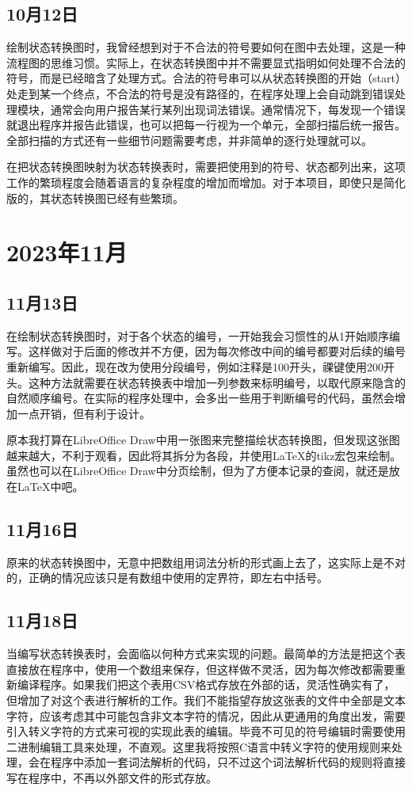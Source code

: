 \subsection{10月12日}
绘制状态转换图时，我曾经想到对于不合法的符号要如何在图中去处理，这是一种流程图的思维习惯。实际上，在状态转换图中并不需要显式指明如何处理不合法的符号，而是已经暗含了处理方式。合法的符号串可以从状态转换图的开始（start）处走到某一个终点，不合法的符号是没有路径的，在程序处理上会自动跳到错误处理模块，通常会向用户报告某行某列出现词法错误。通常情况下，每发现一个错误就退出程序并报告此错误，也可以把每一行视为一个单元，全部扫描后统一报告。全部扫描的方式还有一些细节问题需要考虑，并非简单的逐行处理就可以。

在把状态转换图映射为状态转换表时，需要把使用到的符号、状态都列出来，这项工作的繁琐程度会随着语言的复杂程度的增加而增加。对于本项目，即使只是简化版的，其状态转换图已经有些繁琐。


\section{2023年11月}


\subsection{11月13日}
在绘制状态转换图时，对于各个状态的编号，一开始我会习惯性的从1开始顺序编写。这样做对于后面的修改并不方便，因为每次修改中间的编号都要对后续的编号重新编写。因此，现在改为使用分段编号，例如注释是100开头，祼键使用200开头。这种方法就需要在状态转换表中增加一列参数来标明编号，以取代原来隐含的自然顺序编号。在实际的程序处理中，会多出一些用于判断编号的代码，虽然会增加一点开销，但有利于设计。

原本我打算在LibreOffice Draw中用一张图来完整描绘状态转换图，但发现这张图越来越大，不利于观看，因此将其拆分为各段，并使用LaTeX的tikz宏包来绘制。虽然也可以在LibreOffice Draw中分页绘制，但为了方便本记录的查阅，就还是放在LaTeX中吧。


\subsection{11月16日}
原来的状态转换图中，无意中把数组用词法分析的形式画上去了，这实际上是不对的，正确的情况应该只是有数组中使用的定界符，即左右中括号。


\subsection{11月18日}
当编写状态转换表时，会面临以何种方式来实现的问题。最简单的方法是把这个表直接放在程序中，使用一个数组来保存，但这样做不灵活，因为每次修改都需要重新编译程序。如果我们把这个表用CSV格式存放在外部的话，灵活性确实有了，但增加了对这个表进行解析的工作。我们不能指望存放这张表的文件中全部是文本字符，应该考虑其中可能包含非文本字符的情况，因此从更通用的角度出发，需要引入转义字符的方式来可视的实现此表的编辑。毕竟不可见的符号编辑时需要使用二进制编辑工具来处理，不直观。这里我将按照C语言中转义字符的使用规则来处理，会在程序中添加一套词法解析的代码，只不过这个词法解析代码的规则将直接写在程序中，不再以外部文件的形式存放。

